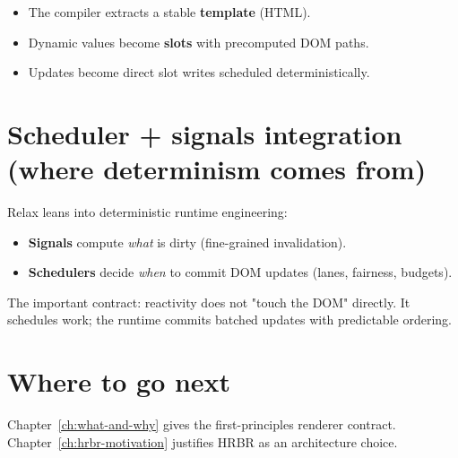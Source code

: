 \begin{itemize}
  \item The compiler extracts a stable \textbf{template} (HTML).
  \item Dynamic values become \textbf{slots} with precomputed DOM paths.
  \item Updates become direct slot writes scheduled deterministically.
\end{itemize}

\section{Scheduler + signals integration (where determinism comes from)}

Relax leans into deterministic runtime engineering:

\begin{itemize}
  \item \textbf{Signals} compute \emph{what} is dirty (fine-grained invalidation).
  \item \textbf{Schedulers} decide \emph{when} to commit DOM updates (lanes, fairness, budgets).
\end{itemize}

The important contract: reactivity does not "touch the DOM" directly.
It schedules work; the runtime commits batched updates with predictable ordering.

\section{Where to go next}

Chapter~\ref{ch:what-and-why} gives the first-principles renderer contract.
Chapter~\ref{ch:hrbr-motivation} justifies HRBR as an architecture choice.
